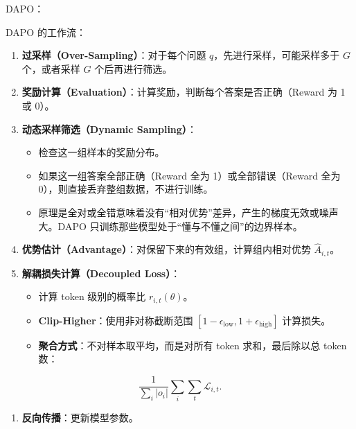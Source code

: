 DAPO：

DAPO 的工作流：

\begin{enumerate}
\def\labelenumi{\arabic{enumi}.}
\tightlist
\item
  \textbf{过采样（Over-Sampling）}：对于每个问题 \(q\)，先进行采样，可能采样多于 \(G\) 个，或者采样 \(G\) 个后再进行筛选。
\item
  \textbf{奖励计算（Evaluation）}：计算奖励，判断每个答案是否正确（Reward 为 1 或 0）。
\item
{}
  \textbf{动态采样筛选（Dynamic Sampling）}：

  \begin{itemize}
  \tightlist
  \item
    检查这一组样本的奖励分布。
  \item
    如果这一组答案全部正确（Reward 全为 1）或全部错误（Reward 全为 0），则直接丢弃整组数据，不进行训练。
  \item
    原理是全对或全错意味着没有``相对优势''差异，产生的梯度无效或噪声大。DAPO 只训练那些模型处于``懂与不懂之间''的边界样本。
  \end{itemize}
\item
  \textbf{优势估计（Advantage）}：对保留下来的有效组，计算组内相对优势 \(\hat{A}_{i,t}\)。
\item
{}
  \textbf{解耦损失计算（Decoupled Loss）}：

  \begin{itemize}
  \tightlist
  \item
    计算 token 级别的概率比 \(r_{i,t}(\theta)\)。
  \item
    \textbf{Clip-Higher}：使用非对称截断范围 \([1-\epsilon_{\mathrm{low}},1+\epsilon_{\mathrm{high}}]\) 计算损失。
  \item
{}
    \textbf{聚合方式}：不对样本取平均，而是对所有 token 求和，最后除以总 token 数：
  \end{itemize}
\end{enumerate}

\[
\frac{1}{\sum_i |o_i|}
\sum_i \sum_t \mathcal{L}_{i,t}.
\]

\begin{enumerate}
\def\labelenumi{\arabic{enumi}.}
\setcounter{enumi}{5}
\tightlist
\item
  \textbf{反向传播}：更新模型参数。
\end{enumerate}

